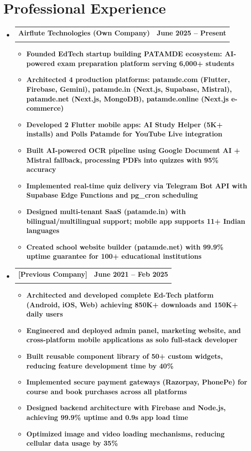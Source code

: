 \documentclass[letterpaper,11pt]{article}
\makeatletter
\newcommand{\resumeItem}[1]{\item\small{\bfseries\color{textblack}#1}\vspace{-2pt}}
\newcommand{\resumeSubheading}[4]{
  \item\small{
    \begin{tabular*}{0.97\textwidth}[t]{l@{\extracolsep{\fill}}r}
      \textbf{\large\color{headingblack}#1} & \textbf{\color{textblack}#2} \\
      \textbf{\color{textblack}\textit{#3}} & \textbf{\color{textblack}\textit{#4}} \\
    \end{tabular*}\vspace{-7pt}
  }
}
\renewcommand{\textbf}[1]{{\bfseries\color{headingblack}#1}}
\renewcommand{\textit}[1]{{\itshape\bfseries\color{textblack}#1}}
\makeatother
\begin{document}
\section{Professional Experience}
\begin{itemize}[leftmargin=*]
\resumeSubheading
    {Airflute Technologies (Own Company)}{June 2025 -- Present}
    {Founder \& Full Stack Developer}{Jaipur, India}
    \begin{itemize}[leftmargin=*]
        \resumeItem{Founded EdTech startup building PATAMDE ecosystem: AI-powered exam preparation platform serving \textbf{6,000+ students}}
        \resumeItem{Architected \textbf{4 production platforms}: patamde.com (Flutter, Firebase, Gemini), patamde.in (Next.js, Supabase, Mistral), patamde.net (Next.js, MongoDB), patamde.online (Next.js e-commerce)}
        \resumeItem{Developed \textbf{2 Flutter mobile apps}: AI Study Helper (5K+ installs) and Polls Patamde for YouTube Live integration}
        \resumeItem{Built AI-powered OCR pipeline using Google Document AI + Mistral fallback, processing PDFs into quizzes with \textbf{95\% accuracy}}
        \resumeItem{Implemented real-time quiz delivery via Telegram Bot API with Supabase Edge Functions and pg\_cron scheduling}
        \resumeItem{Designed multi-tenant SaaS (patamde.in) with bilingual/multilingual support; mobile app supports \textbf{11+ Indian languages}}
        \resumeItem{Created school website builder (patamde.net) with \textbf{99.9\% uptime} guarantee for 100+ educational institutions}
    \end{itemize}
    
\vspace{1mm}

\resumeSubheading
    {[Previous Company]}{June 2021 -- Feb 2025}
    {Senior Full Stack Mobile \& Web Application Developer}{Jaipur, India}
    \begin{itemize}[leftmargin=*]
        \resumeItem{Architected and developed complete Ed-Tech platform (Android, iOS, Web) achieving \textbf{850K+ downloads} and \textbf{150K+ daily users}}
        \resumeItem{Engineered and deployed admin panel, marketing website, and cross-platform mobile applications as solo full-stack developer}
        \resumeItem{Built reusable component library of \textbf{50+ custom widgets}, reducing feature development time by \textbf{40\%}}
        \resumeItem{Implemented secure payment gateways (Razorpay, PhonePe) for course and book purchases across all platforms}
        \resumeItem{Designed backend architecture with Firebase and Node.js, achieving \textbf{99.9\% uptime} and \textbf{0.9s app load time}}
        \resumeItem{Optimized image and video loading mechanisms, reducing cellular data usage by \textbf{35\%}}
    \end{itemize}
    

\end{itemize}
\end{document}
